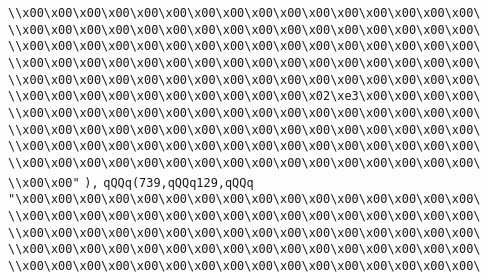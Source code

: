 \verb|\\x00\x00\x00\x00\x00\x00\x00\x00\x00\x00\x00\x00\x00\x00\x00\x00\|\newline
\verb|\\x00\x00\x00\x00\x00\x00\x00\x00\x00\x00\x00\x00\x00\x00\x00\x00\|\newline
\verb|\\x00\x00\x00\x00\x00\x00\x00\x00\x00\x00\x00\x00\x00\x00\x00\x00\|\newline
\verb|\\x00\x00\x00\x00\x00\x00\x00\x00\x00\x00\x00\x00\x00\x00\x00\x00\|\newline
\verb|\\x00\x00\x00\x00\x00\x00\x00\x00\x00\x00\x00\x00\x00\x00\x00\x00\|\newline
\verb|\\x00\x00\x00\x00\x00\x00\x00\x00\x00\x00\x02\xe3\x00\x00\x00\x00\|\newline
\verb|\\x00\x00\x00\x00\x00\x00\x00\x00\x00\x00\x00\x00\x00\x00\x00\x00\|\newline
\verb|\\x00\x00\x00\x00\x00\x00\x00\x00\x00\x00\x00\x00\x00\x00\x00\x00\|\newline
\verb|\\x00\x00\x00\x00\x00\x00\x00\x00\x00\x00\x00\x00\x00\x00\x00\x00\|\newline
\verb|\\x00\x00\x00\x00\x00\x00\x00\x00\x00\x00\x00\x00\x00\x00\x00\x00\|\newline
\verb|\\x00\x00"|\newline
\verb|),|\newline
\verb|qQQq(739,qQQq129,qQQq|\newline
\verb|"\x00\x00\x00\x00\x00\x00\x00\x00\x00\x00\x00\x00\x00\x00\x00\x00\|\newline
\verb|\\x00\x00\x00\x00\x00\x00\x00\x00\x00\x00\x00\x00\x00\x00\x00\x00\|\newline
\verb|\\x00\x00\x00\x00\x00\x00\x00\x00\x00\x00\x00\x00\x00\x00\x00\x00\|\newline
\verb|\\x00\x00\x00\x00\x00\x00\x00\x00\x00\x00\x00\x00\x00\x00\x00\x00\|\newline
\verb|\\x00\x00\x00\x00\x00\x00\x00\x00\x00\x00\x00\x00\x00\x00\x00\x00\|\newline
